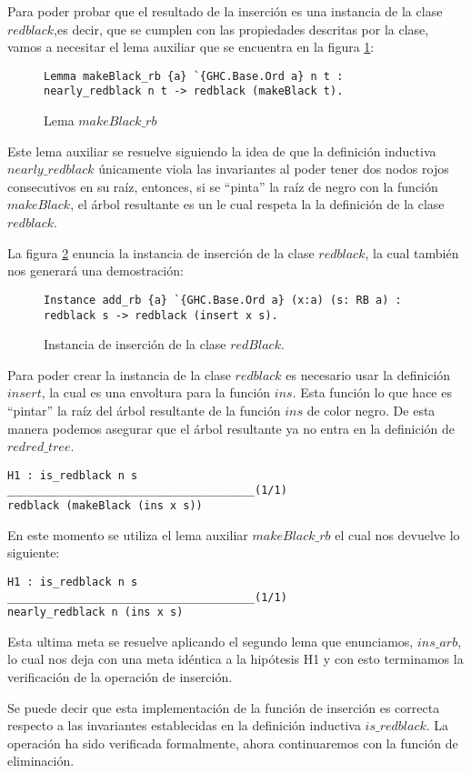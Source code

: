 Para poder probar que el resultado de la inserci\'on es una instancia de la clase $redblack$,es decir, que se cumplen con las propiedades descritas por la clase, vamos a necesitar el
lema auxiliar que se encuentra en la figura \ref{lema_3}:
\begin{figure}[!ht]
\centering
\captionsetup{justification=centering}
\begin{verbatim}
Lemma makeBlack_rb {a} `{GHC.Base.Ord a} n t :
nearly_redblack n t -> redblack (makeBlack t).
\end{verbatim}
\caption{Lema $makeBlack\_rb$}
\label{lema_3}
\end{figure}

Este lema auxiliar se resuelve siguiendo la idea de que la definici\'on inductiva $nearly\_redblack$ únicamente viola las invariantes al poder tener dos 
nodos rojos consecutivos en su raíz, entonces, si se ``pinta'' la raíz de negro con la función $makeBlack$, el \'arbol resultante es un {\arn} le cual respeta la la definición de la clase $redblack$.

La figura \ref{instance_ins} enuncia la instancia de inserci\'on de la clase $redblack$, la cual también nos generar\'a una demostraci\'on:

\begin{figure}[!ht]
\centering
\captionsetup{justification=centering}
\begin{verbatim}
Instance add_rb {a} `{GHC.Base.Ord a} (x:a) (s: RB a) :
redblack s -> redblack (insert x s).
\end{verbatim}
\caption{Instancia de inserci\'on de la clase $redBlack$.}
\label{instance_ins}
\end{figure}

Para poder crear la instancia de la clase $redblack$ es necesario usar la definici\'on $insert$,
la cual es una envoltura para la funci\'on $ins$. Esta funci\'on lo que hace es ``pintar'' la
ra\'iz del \'arbol resultante de la funci\'on $ins$ de color negro. De esta manera podemos
asegurar que el \'arbol resultante ya no entra en la definici\'on de $redred\_tree$.

\begin{verbatim}
H1 : is_redblack n s
______________________________________(1/1)
redblack (makeBlack (ins x s))
\end{verbatim}

En este momento se utiliza el lema auxiliar $makeBlack\_rb$ el cual nos devuelve lo siguiente:

\begin{verbatim}
H1 : is_redblack n s
______________________________________(1/1)
nearly_redblack n (ins x s)
\end{verbatim}

Esta ultima meta se resuelve aplicando el segundo lema que enunciamos, $ins\_arb$, lo cual nos deja
con una meta idéntica a la hipótesis H1 y con esto terminamos la verificaci\'on de la operaci\'on
de inserci\'on.

Se puede decir que esta implementaci\'on de la funci\'on de inserci\'on es correcta
respecto a las invariantes establecidas en la definici\'on inductiva $is\_redblack$. La operaci\'on ha
sido verificada formalmente, ahora continuaremos con la funci\'on de eliminaci\'on.
